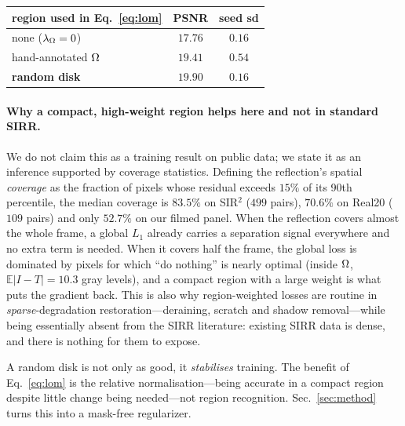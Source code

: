 \begin{center}
\small
\setlength{\tabcolsep}{4pt}
\begin{tabular}{lcc}
\toprule
region used in Eq.~\eqref{eq:lom} & PSNR & seed sd \\
\midrule
none ($\lambda_\Omega=0$) & $17.76$ & $0.16$ \\
hand-annotated $\Omega$ & $19.41$ & $0.54$ \\
\textbf{random disk} & $\mathbf{19.90}$ & $\mathbf{0.16}$ \\
\bottomrule
\end{tabular}
\end{center}

\paragraph{Why a compact, high-weight region helps here and not in standard SIRR.}
We do not claim this as a training result on public data; we state it as an inference supported by
coverage statistics. Defining the reflection's spatial \emph{coverage} as the fraction of pixels
whose residual exceeds $15\%$ of its 90th percentile, the median coverage is $83.5\%$ on
SIR$^2$ ($499$ pairs), $70.6\%$ on Real20 ($109$ pairs) and only $52.7\%$ on our filmed panel. When
the reflection covers almost the whole frame, a global $L_1$ already carries a separation signal
everywhere and no extra term is needed. When it covers half the frame, the global loss is dominated
by pixels for which ``do nothing'' is nearly optimal (inside $\Omega$, $\mathbb{E}|I-T|=10.3$ gray
levels), and a compact region with a large weight is what puts the gradient back. This is also why
region-weighted losses are routine in \emph{sparse}-degradation restoration---deraining, scratch and
shadow removal---while being essentially absent from the SIRR literature: existing SIRR data is
dense, and there is nothing for them to expose.

A random disk is not only as good, it \emph{stabilises} training. The benefit of
Eq.~\eqref{eq:lom} is the relative normalisation---being accurate in a compact region
despite little change being needed---not region recognition. Sec.~\ref{sec:method} turns
this into a mask-free regularizer.

